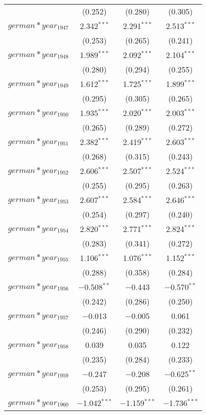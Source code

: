 \begin{table}[!h]
\begin{tabular}{@{\extracolsep{5pt}}lccc}
  & (0.252) & (0.280) & (0.305) \\ 
  $german*year_1947$ & 2.342$^{***}$ & 2.291$^{***}$ & 2.513$^{***}$ \\ 
  & (0.253) & (0.265) & (0.241) \\ 
  $german*year_1948$ & 1.989$^{***}$ & 2.092$^{***}$ & 2.104$^{***}$ \\ 
  & (0.280) & (0.294) & (0.255) \\ 
  $german*year_1949$ & 1.612$^{***}$ & 1.725$^{***}$ & 1.899$^{***}$ \\ 
  & (0.295) & (0.305) & (0.265) \\ 
  $german*year_1950$ & 1.935$^{***}$ & 2.020$^{***}$ & 2.003$^{***}$ \\ 
  & (0.265) & (0.289) & (0.272) \\ 
  $german*year_1951$ & 2.382$^{***}$ & 2.419$^{***}$ & 2.603$^{***}$ \\ 
  & (0.268) & (0.315) & (0.243) \\ 
  $german*year_1952$ & 2.606$^{***}$ & 2.507$^{***}$ & 2.524$^{***}$ \\ 
  & (0.255) & (0.295) & (0.263) \\ 
  $german*year_1953$ & 2.607$^{***}$ & 2.584$^{***}$ & 2.646$^{***}$ \\ 
  & (0.254) & (0.297) & (0.240) \\ 
  $german*year_1954$ & 2.820$^{***}$ & 2.771$^{***}$ & 2.824$^{***}$ \\ 
  & (0.283) & (0.341) & (0.272) \\ 
  $german*year_1955$ & 1.106$^{***}$ & 1.076$^{***}$ & 1.152$^{***}$ \\ 
  & (0.288) & (0.358) & (0.284) \\ 
  $german*year_1956$ & $-$0.508$^{**}$ & $-$0.443 & $-$0.570$^{**}$ \\ 
  & (0.242) & (0.286) & (0.250) \\ 
  $german*year_1957$ & $-$0.013 & $-$0.005 & 0.061 \\ 
  & (0.246) & (0.290) & (0.232) \\ 
  $german*year_1958$ & 0.039 & 0.035 & 0.122 \\ 
  & (0.235) & (0.284) & (0.233) \\ 
  $german*year_1959$ & $-$0.247 & $-$0.208 & $-$0.625$^{**}$ \\ 
  & (0.253) & (0.295) & (0.261) \\ 
  $german*year_1960$ & $-$1.042$^{***}$ & $-$1.159$^{***}$ & $-$1.736$^{***}$ \\ 

\end{tabular}
\end{table}

